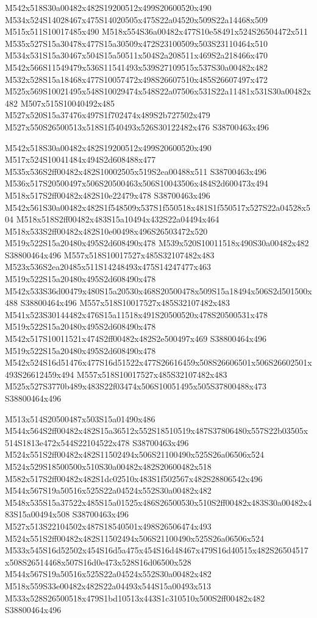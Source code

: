 \documentclass{article}
\begin{document}
\begin{multicols}{2}
M542x518S30a00482x482S19200512x499S20600520x490 M534x524S14028467x475S14020505x475S22a04520x509S22a14468x509 M515x511S10017485x490 M518x554S36a00482x477S10e58491x524S26504472x511 M535x527S15a30478x477S15a30509x472S23100509x503S23110464x510 M534x531S15a30467x504S15a50511x504S2a208511x469S2a218466x470 M542x566S11549479x536S11541493x539S27109515x537S30a00482x482 M532x528S15a18468x477S10057472x498S26607510x485S26607497x472 M525x569S10021495x548S10029474x548S22a07506x531S22a11481x531S30a00482x482 M507x515S10040492x485 M527x520S15a37476x497S1f702474x489S2b727502x479 M527x550S26500513x518S1f540493x526S30122482x476 S38700463x496

M542x518S30a00482x482S19200512x499S20600520x490 M517x524S10041484x494S2d608488x477 M535x536S2ff00482x482S10002505x519S2ea00488x511 S38700463x496 M536x517S20500497x506S20500463x506S10043506x484S2d600473x494 M518x517S2ff00482x482S10e22479x478 S38700463x496 M542x561S30a00482x482S1f548509x537S1f550518x481S1f550517x527S22a04528x504 M518x518S2ff00482x483S15a10494x432S22a04494x464 M518x533S2ff00482x482S10e00498x496S26503472x520 M519x522S15a20480x495S2d608490x478 M539x520S10011518x490S30a00482x482 S38800464x496 M557x518S10017527x485S32107482x483 M523x536S2ea20485x511S14248493x475S14247477x463 M519x522S15a20480x495S2d608490x478 M542x533S36d00479x480S15a20530x468S20500478x509S15a18494x506S2d501500x488 S38800464x496 M557x518S10017527x485S32107482x483 M541x523S30144482x476S15a11518x491S20500520x478S20500531x478 M519x522S15a20480x495S2d608490x478 M542x517S10011521x474S2ff00482x482S2e500497x469 S38800464x496 M519x522S15a20480x495S2d608490x478 M542x524S16d51476x477S16d51522x477S26616459x508S26606501x506S26602501x493S26612459x494 M557x518S10017527x485S32107482x483 M525x527S3770b489x483S22f03474x506S10051495x505S37800488x473 S38800464x496

M513x514S20500487x503S15a01490x486 M544x564S2ff00482x482S15a36512x552S18510519x487S37806480x557S22b03505x514S1813e472x544S22104522x478 S38700463x496 M524x551S2ff00482x482S11502494x506S21100490x525S26a06506x524 M524x529S18500500x510S30a00482x482S20600482x518 M582x517S2ff00482x482S1dc02510x483S1f502567x482S28806542x496 M544x567S19a50516x525S22a04524x552S30a00482x482 M548x535S15a37522x485S15a01525x486S26500530x510S2ff00482x483S30a00482x483S15a00494x508 S38700463x496 M527x513S22104502x487S18540501x498S26506474x493 M524x551S2ff00482x482S11502494x506S21100490x525S26a06506x524 M533x545S16d52502x454S16d5a475x454S16d48467x479S16d40515x482S26504517x508S26514468x507S16d0e473x528S16d06500x528 M544x567S19a50516x525S22a04524x552S30a00482x482 M518x559S33e00482x482S22a04493x544S15a00493x513 M533x528S26500518x479S1bd10513x443S1c310510x500S2ff00482x482 S38800464x496


\end{multicols}
\end{document}
